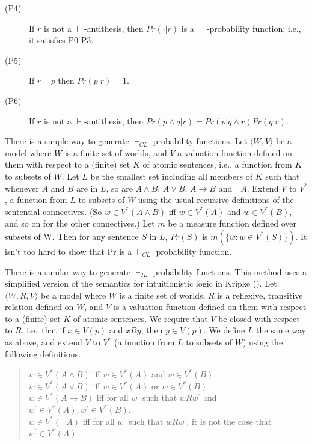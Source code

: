 \documentclass[
  11pt,
  letterpaper,
  DIV=11,
  numbers=noendperiod,
  oneside]{scrartcl}
\begin{document}
\begin{description}
\item[(P4)]
If \(r\) is not a \(\vdash\)-antithesis, then \(Pr(\cdot | r)\) is a
\(\vdash\)-probability function; i.e., it satisfies P0-P3.
\item[(P5)]
If \(r \vdash p\) then \(Pr(p | r) = 1\).
\item[(P6)]
If \(r\) is not a \(\vdash\)-antithesis, then
\(Pr(p \wedge q | r) = Pr(p | q \wedge r)Pr(q | r)\).
\end{description}

There is a simple way to generate \(\vdash_{CL}\) probability functions.
Let \(\langle W, V\rangle\) be a model where \(W\) is a finite set of
worlds, and \(V\) a valuation function defined on them with respect to a
(finite) set \(K\) of atomic sentences, i.e., a function from \(K\) to
subsets of \(W\). Let \(L\) be the smallest set including all members of
\(K\) such that whenever \(A\) and \(B\) are in \(L\), so are
\(A \wedge B\), \(A \vee B\), \(A \rightarrow B\) and \(\neg A\). Extend
\(V\) to \(V^*\), a function from \(L\) to subsets of \(W\) using the
usual recursive definitions of the sentential connectives. (So
\(w \in V^*(A \wedge B)\) iff \(w \in V^*(A)\) and \(w \in V^*(B)\), and
so on for the other connectives.) Let \(m\) be a measure function
defined over subsets of W. Then for any sentence \(S\) in \(L\),
\(Pr(S)\) is \(m(\{w: w \in V^*(S)\})\). It isn't too hard to show that
Pr is a \(\vdash_{CL}\) probability function.

There is a similar way to generate \(\vdash_{IL}\) probability
functions. This method uses a simplified version of the semantics for
intuitionistic logic in Kripke (). Let
\(\langle W, R, V\rangle\) be a model where \(W\) is a finite set of
worlds, \(R\) is a reflexive, transitive relation defined on \(W\), and
\(V\) is a valuation function defined on them with respect to a (finite)
set \(K\) of atomic sentences. We require that \(V\) be closed with
respect to \(R\), i.e.~that if \(x \in V(p)\) and \(xRy\), then
\(y \in V(p)\). We define \(L\) the same way as above, and extend \(V\)
to \(V^*\) (a function from \(L\) to subsets of \(W\)) using the
following definitions.

\begin{quote}
\(w \in V^*(A \wedge B)\) iff \(w \in V^*(A)\) and \(w \in V^*(B)\).\\
\(w \in V^*(A \vee B)\) iff \(w \in V^*(A)\) or \(w \in V^*(B)\).\\
\(w \in V^*(A \rightarrow B)\) iff for all \(w^{\prime}\) such that
\(wRw^{\prime}\) and \(w^{\prime}\in V^*(A), w^{\prime} \in V^*(B)\).\\
\(w \in V^*(\neg A)\) iff for all \(w^{\prime}\) such that
\(wRw^{\prime}\), it is not the case that \(w^{\prime} \in V^*(A)\).
\end{quote}
\end{document}
